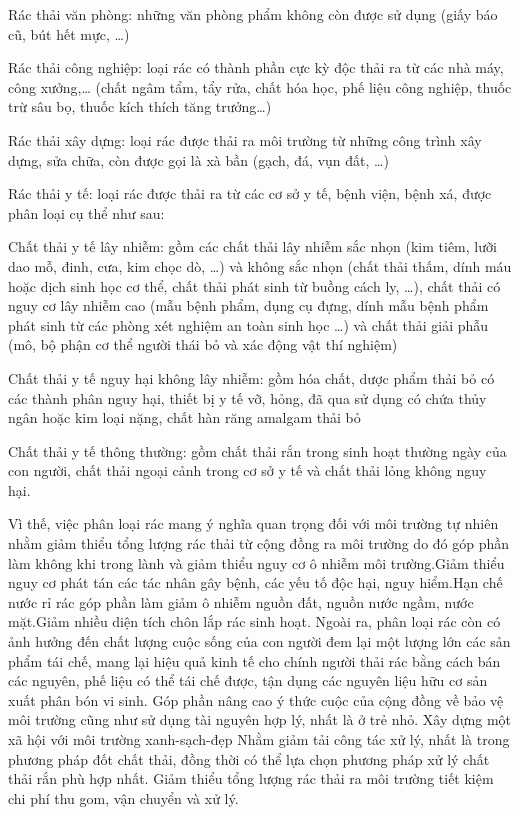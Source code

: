 
Rác thải văn phòng: những văn phòng phẩm không còn được sử dụng (giấy báo cũ,  bút hết mực, …)

 Rác thải công nghiệp: loại rác có thành phần cực kỳ độc thải ra từ các nhà máy, công xưởng,… (chất ngâm tẩm, tẩy rửa, chất hóa học, phế liệu công nghiệp, thuốc trừ sâu bọ, thuốc kích thích tăng trưởng…) 

 Rác thải xây dựng: loại rác được thải ra môi trường từ những công trình xây dựng, sửa chữa, còn được gọi là xà bần (gạch, đá, vụn đất, …)

 Rác thải y tế: loại rác được thải ra từ các cơ sở y tế, bệnh viện, bệnh xá, được phân loại cụ thể như sau:

	 Chất thải y tế lây nhiễm: gồm các chất thải lây nhiễm sắc nhọn (kim tiêm, lưỡi dao mỗ, đinh, cưa, kim chọc dò, …) và không sắc nhọn (chất thải thấm, dính máu hoặc dịch sinh học cơ thể, chất thải phát sinh từ buồng cách ly, …), chất thải có nguy cơ lây nhiễm cao (mẫu bệnh phẩm, dụng cụ đựng, dính mẫu bệnh phẩm phát sinh từ các phòng xét nghiệm an toàn sinh học …) và chất thải giải phẫu (mô, bộ phận cơ thể người thái bỏ và xác động vật thí nghiệm)

	 Chất thải y tế nguy hại không lây nhiễm: gồm hóa chất, dược phẩm thải bỏ có các thành phân nguy hại, thiết bị y tế vỡ, hỏng, đã qua sử dụng có chứa thủy ngân hoặc kim loại nặng, chất hàn răng amalgam thải bỏ

	 Chất thải y tế thông thường: gồm chất thải rắn trong sinh hoạt thường ngày của con người, chất thải ngoại cảnh trong cơ sở y tế và chất thải lỏng không nguy hại.

Vì thế, việc phân loại rác mang ý nghĩa quan trọng đối với môi trường tự nhiên nhằm giảm thiểu tổng lượng rác thải từ cộng đồng ra môi trường do đó góp phần làm không khi trong lành và giảm thiểu nguy cơ ô nhiễm môi trường.Giảm thiểu nguy cơ phát tán các tác nhân gây bệnh, các yếu tố độc hại, nguy hiểm.Hạn chế nước rỉ rác góp phần làm giảm ô nhiễm nguồn đất, nguồn nước ngầm, nước mặt.Giảm nhiều diện tích chôn lắp rác sinh hoạt. Ngoài ra, phân loại rác còn có ảnh hưởng đến chất lượng cuộc sống của con người đem lại một lượng lớn các sản phẩm tái chế, mang lại hiệu quả kinh tế cho chính người thải rác bằng cách bán các nguyên, phế liệu có thể tái chế được, tận dụng các nguyên liệu hữu cơ sản xuất phân bón vi sinh.
Góp phần nâng cao ý thức cuộc của cộng đồng về bảo vệ môi trường cũng như sử dụng tài nguyên hợp lý, nhất là ở trẻ nhỏ.
Xây dựng một xã hội với môi trường xanh-sạch-đẹp
Nhằm giảm tải công tác xử lý, nhất là trong phương pháp đốt chất thải, đồng thời có thể lựa chọn phương pháp xử lý chất thải rắn phù hợp nhất.
Giảm thiểu tổng lượng rác thải ra môi trường tiết kiệm chi phí thu gom, vận chuyển và xử lý.

